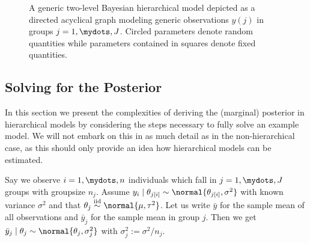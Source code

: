\begin{figure}[ht]
\begin{center}
\end{center}
\label{fig:group_sem}
\caption{A generic two-level Bayesian hierarchical model depicted as a directed acyclical graph modeling generic observations $y(j)$ in groups $j = 1,\mydots, J$. Circled parameters denote random quantities while parameters contained in squares denote fixed quantities.}
\end{figure}

\subsection{Solving for the Posterior}
In this section we present the complexities of deriving the (marginal) posterior in hierarchical models by considering the steps necessary to fully solve an example model.
We will not embark on this in as much detail as in the non-hierarchical case, as this should only provide an idea how hierarchical models can be estimated.

Say we observe $i=1,\mydots,n$ individuals which fall in $j=1,\mydots,J$ groups with groupsize $n_j$.
Assume $y_i \mid \theta_{j[i]} \sim \normal{\theta_{j[i]}, \sigma^2}$ with known variance $\sigma^2$ and that $\theta_j \overset{\text{iid}}{\sim} \normal{\mu, \tau^2}$.
Let us write $\bar{y}$ for the sample mean of all observations and $\bar{y}_j$ for the sample mean in group $j$.
Then we get $\bar{y}_j \mid \theta_j \sim \normal{\theta_j, \sigma_j^2}$ with $\sigma_j^2 := \sigma^2 / n_j$.

